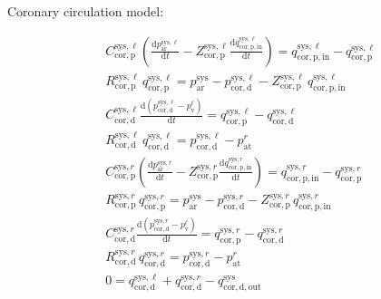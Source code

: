 \documentclass[a4paper,12pt]{report}
\begin{document}
Coronary circulation model:

\begin{align}
&C_{\mathrm{cor,p}}^{\mathrm{sys},\ell} \left(\frac{\mathrm{d}p_{\mathrm{ar}}^{\mathrm{sys},\ell}}{\mathrm{d}t}-Z_{\mathrm{cor,p}}^{\mathrm{sys},\ell}\frac{\mathrm{d}q_{\mathrm{cor,p,in}}^{\mathrm{sys},\ell}}{\mathrm{d}t}\right) = q_{\mathrm{cor,p,in}}^{\mathrm{sys},\ell} - q_{\mathrm{cor,p}}^{\mathrm{sys},\ell}\nonumber\\
&R_{\mathrm{cor,p}}^{\mathrm{sys},\ell}\,q_{\mathrm{cor,p}}^{\mathrm{sys},\ell}=p_{\mathrm{ar}}^{\mathrm{sys}}-p_{\mathrm{cor,d}}^{\mathrm{sys},\ell} - Z_{\mathrm{cor,p}}^{\mathrm{sys},\ell}\,q_{\mathrm{cor,p,in}}^{\mathrm{sys},\ell}\nonumber\\
&C_{\mathrm{cor,d}}^{\mathrm{sys},\ell} \frac{\mathrm{d}(p_{\mathrm{cor,d}}^{\mathrm{sys},\ell}-p_{\mathrm{v}}^{\ell})}{\mathrm{d}t} = q_{\mathrm{cor,p}}^{\mathrm{sys},\ell} - q_{\mathrm{cor,d}}^{\mathrm{sys},\ell}\nonumber\\
&R_{\mathrm{cor,d}}^{\mathrm{sys},\ell}\,q_{\mathrm{cor,d}}^{\mathrm{sys},\ell}=p_{\mathrm{cor,d}}^{\mathrm{sys},\ell}-p_{\mathrm{at}}^{r}\nonumber\\
&C_{\mathrm{cor,p}}^{\mathrm{sys},r} \left(\frac{\mathrm{d}p_{\mathrm{ar}}^{\mathrm{sys},r}}{\mathrm{d}t}-Z_{\mathrm{cor,p}}^{\mathrm{sys},r}\frac{\mathrm{d}q_{\mathrm{cor,p,in}}^{\mathrm{sys},r}}{\mathrm{d}t}\right) = q_{\mathrm{cor,p,in}}^{\mathrm{sys},r} - q_{\mathrm{cor,p}}^{\mathrm{sys},r}\nonumber\\
&R_{\mathrm{cor,p}}^{\mathrm{sys},r}\,q_{\mathrm{cor,p}}^{\mathrm{sys},r}=p_{\mathrm{ar}}^{\mathrm{sys}}-p_{\mathrm{cor,d}}^{\mathrm{sys},r} - Z_{\mathrm{cor,p}}^{\mathrm{sys},r}\,q_{\mathrm{cor,p,in}}^{\mathrm{sys},r}\nonumber\\
&C_{\mathrm{cor,d}}^{\mathrm{sys},r} \frac{\mathrm{d}(p_{\mathrm{cor,d}}^{\mathrm{sys},r}-p_{\mathrm{v}}^{\ell})}{\mathrm{d}t} = q_{\mathrm{cor,p}}^{\mathrm{sys},r} - q_{\mathrm{cor,d}}^{\mathrm{sys},r}\nonumber\\
&R_{\mathrm{cor,d}}^{\mathrm{sys},r}\,q_{\mathrm{cor,d}}^{\mathrm{sys},r}=p_{\mathrm{cor,d}}^{\mathrm{sys},r}-p_{\mathrm{at}}^{r}\nonumber\\
&0=q_{\mathrm{cor,d}}^{\mathrm{sys},\ell}+q_{\mathrm{cor,d}}^{\mathrm{sys},r}-q_{\mathrm{cor,d,out}}^{\mathrm{sys}}\nonumber
\end{align}
\end{document}
